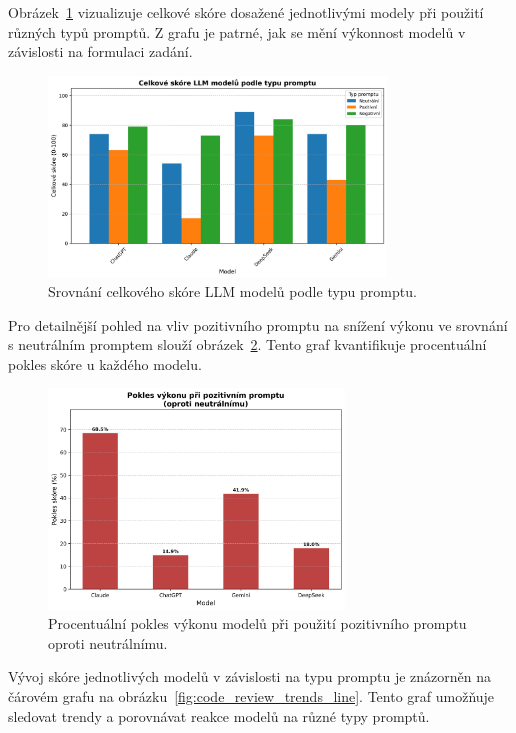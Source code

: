 \documentclass[12pt, a4paper]{article}
\begin{document}
Obrázek~\ref{fig:code_review_bar_comparison} vizualizuje celkové skóre dosažené jednotlivými modely při použití různých typů promptů. Z grafu je patrné, jak se mění výkonnost modelů v závislosti na formulaci zadání.

\begin{figure}[H]
\centering
\includegraphics[width=0.8\textwidth]{llm_code_review_comparison_bar.png} 
\caption{Srovnání celkového skóre LLM modelů podle typu promptu.}
\label{fig:code_review_bar_comparison}
\end{figure}

Pro detailnější pohled na vliv pozitivního promptu na snížení výkonu ve srovnání s neutrálním promptem slouží obrázek~\ref{fig:positive_prompt_decrease}. Tento graf kvantifikuje procentuální pokles skóre u každého modelu.

\begin{figure}[H]
\centering
\includegraphics[width=0.7\textwidth]{llm_positive_prompt_decrease.png}
\caption{Procentuální pokles výkonu modelů při použití pozitivního promptu oproti neutrálnímu.}
\label{fig:positive_prompt_decrease}
\end{figure}

Vývoj skóre jednotlivých modelů v závislosti na typu promptu je znázorněn na čárovém grafu na obrázku~\ref{fig:code_review_trends_line}. Tento graf umožňuje sledovat trendy a porovnávat reakce modelů na různé typy promptů.
\end{document}
